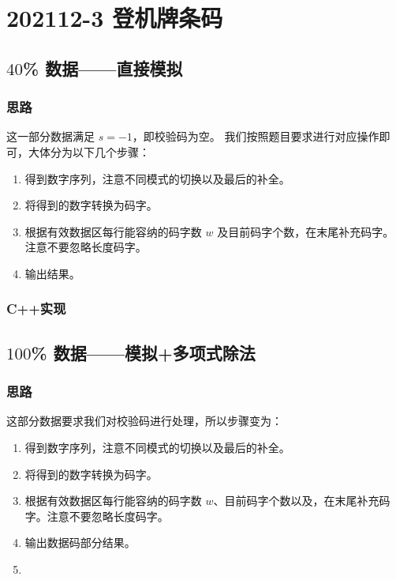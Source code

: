 \section{202112-3 登机牌条码}



\subsection{$40$\% 数据——直接模拟}

\subsubsection{思路}

这一部分数据满足 $s=-1$，即校验码为空。
我们按照题目要求进行对应操作即可，大体分为以下几个步骤：

\begin{enumerate}
    \item 得到数字序列，注意不同模式的切换以及最后的补全。
    \item 将得到的数字转换为码字。
    \item 根据有效数据区每行能容纳的码字数 $w$ 及目前码字个数，在末尾补充码字。注意不要忽略长度码字。
    \item 输出结果。
\end{enumerate}

\subsubsection{C++实现}



\subsection{$100$\% 数据——模拟+多项式除法}

\subsubsection{思路}

这部分数据要求我们对校验码进行处理，所以步骤变为：

\begin{enumerate}
    \item 得到数字序列，注意不同模式的切换以及最后的补全。
    \item 将得到的数字转换为码字。
    \item 根据有效数据区每行能容纳的码字数 $w$、目前码字个数以及{}，在末尾补充码字。注意不要忽略长度码字。
    \item 输出数据码部分结果。
    \item {}
\end{enumerate}

